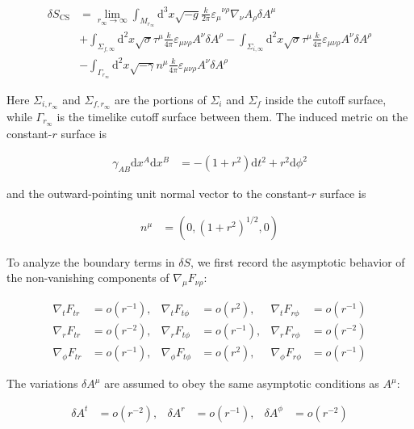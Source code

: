\begin{align}
\delta S_{\mathrm{CS}} & =\lim_{ r_{\infty} \to \infty }\int _{M_{r_{\infty}}}\mathrm{d}^{3}x\sqrt{ -g } \frac{k}{2\pi}\varepsilon _{\mu}^{~~~\nu \rho}\nabla _{\nu}A_{\rho}\delta A^{\mu} \\
 & +\int _{\Sigma _{f,\infty}}\mathrm{d}^{2}x\sqrt{ \sigma }\tau ^{\mu} \frac{k}{4\pi}\varepsilon _{\mu \nu \rho}A^{\nu}\delta A^{\rho}-\int _{\Sigma _{i,\infty}} \mathrm{d}^{2}x\sqrt{ \sigma }\tau ^{\mu} \frac{k}{4\pi}\varepsilon _{\mu \nu \rho}A^{\nu}\delta A^{\rho} \\
 & -\int _{\Gamma _{r_{\infty}}} \mathrm{d}^{2}x\sqrt{ -\gamma }n^{\mu} \frac{k}{4\pi} \varepsilon _{\mu \nu \rho}A^{\nu}\delta A^{\rho}
\end{align}

Here $\Sigma _{i,r_{\infty}}$ and $\Sigma _{f,r_{\infty}}$ are the portions of $\Sigma _{i}$ and $\Sigma _{f}$ inside the cutoff surface, while $\Gamma _{r_{\infty}}$ is the timelike cutoff surface between them. The induced metric on the constant-$r$ surface is

\begin{align}
\gamma _{AB}\mathrm{d}x^{A}\mathrm{d}x^{B} & =-(1+r^{2})\mathrm{d}t^{2}+r^{2}\mathrm{d}\phi ^{2}
\end{align}

and the outward-pointing unit normal vector to the constant-$r$ surface is

\begin{align}
n^{\mu} & =\left(0,(1+r^{2})^{1/2},0\right)
\end{align}

To analyze the boundary terms in $\delta S$, we first record the asymptotic behavior of the non-vanishing components of $\nabla _{\mu}F_{\nu \rho}$:

\begin{align}
\nabla _{t}F_{tr} & =o(r^{-1}), & \nabla _{t}F_{t\phi} & =o(r^{2}), & \nabla _{t}F_{r\phi} & =o(r^{-1}) \\
\nabla _{r}F_{tr} & =o(r^{-2}), & \nabla _{r}F_{t\phi} & =o(r^{-1}), & \nabla _{r}F_{r\phi} & =o(r^{-2}) \\
\nabla _{\phi}F_{tr} & =o(r^{-1}), & \nabla _{\phi}F_{t\phi} & =o(r^{2}), & \nabla _{\phi}F_{r\phi} & =o(r^{-1})
\end{align}

The variations $\delta A^{\mu}$ are assumed to obey the same asymptotic conditions as $A^{\mu}$:

\begin{align}
\delta A^{t} & =o(r^{-2}), & \delta A^{r} & =o(r^{-1}), & \delta A^{\phi} & =o(r^{-2})
\end{align}

